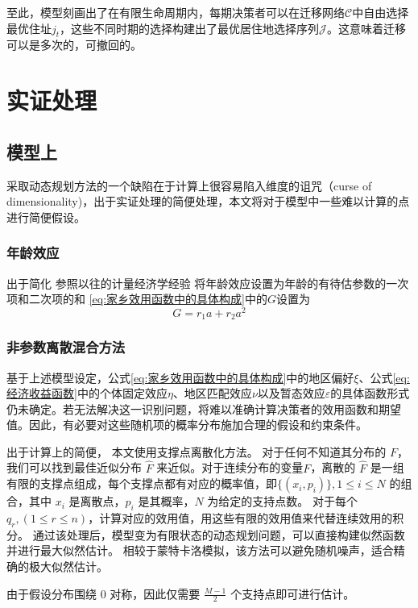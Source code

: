 \documentclass[a4paper,12pt,oneside]{book} %
\begin{document}
至此，模型刻画出了在有限生命周期内，每期决策者可以在迁移网络$\mathcal{C}$中自由选择最优住址$j_t$，这些不同时期的选择构建出了最优居住地选择序列$\mathcal{J}$。这意味着迁移可以是多次的，可撤回的。




\chapter{实证处理}

\section{模型上} 

采取动态规划方法的一个缺陷在于计算上很容易陷入维度的诅咒（curse of dimensionality)，出于实证处理的简便处理，本文将对于模型中一些难以计算的点进行简便假设。

\subsection{年龄效应}
出于简化
参照以往的计量经济学经验
将年龄效应设置为年龄的有待估参数的一次项和二次项的和
\ref{eq:家乡效用函数中的具体构成}中的$G$设置为
$$G=r_1 a + r_2 a^2$$


\subsection{非参数离散混合方法} 

基于上述模型设定，公式\ref{eq:家乡效用函数中的具体构成}中的地区偏好$\xi$、公式\ref{eq:经济收益函数}中的个体固定效应$\eta$、地区匹配效应$\nu$以及暂态效应$\varepsilon$的具体函数形式仍未确定。若无法解决这一识别问题，将难以准确计算决策者的效用函数和期望值。因此，有必要对这些随机项的概率分布施加合理的假设和约束条件。

出于计算上的简便，
本文使用支撑点离散化方法。
对于任何不知道其分布的 $F$，我们可以找到最佳近似分布 $\hat F$ 来近似。对于连续分布的变量$F$，离散的 $\hat F$ 是一组有限的支撑点组成，每个支撑点都有对应的概率值，即$\{(x_i, p_i)\}, 1 \leqslant i \leqslant N$ 的组合，其中 $x_i$ 是离散点，$p_i$ 是其概率，$N$ 为给定的支持点数。
对于每个$q_r, (1\leqslant r \leqslant n )$，计算对应的效用值，用这些有限的效用值来代替连续效用的积分。
通过该处理后，模型变为有限状态的动态规划问题，可以直接构建似然函数并进行最大似然估计。
相较于蒙特卡洛模拟，该方法可以避免随机噪声，适合精确的极大似然估计。

由于假设分布围绕 0 对称，因此仅需要 $\frac{M-1}{2}$ 个支持点即可进行估计。
\end{document}
